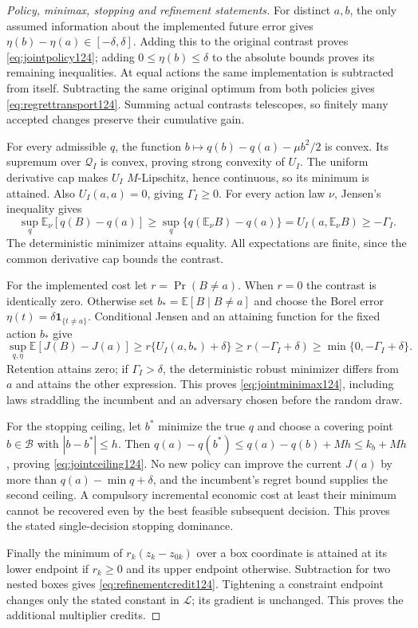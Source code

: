 \begin{proof}[Policy, minimax, stopping and refinement statements]
For distinct $a,b$, the only assumed information about the implemented
future error gives $\eta(b)-\eta(a)\in[-\delta,\delta]$.
Adding this to the original contrast proves
\eqref{eq:jointpolicy124}; adding $0\le\eta(b)\le\delta$ to
the absolute bounds proves its remaining inequalities. At equal
actions the same implementation is subtracted from itself. Subtracting
the same original optimum from both policies gives
\eqref{eq:regrettransport124}. Summing actual contrasts telescopes,
so finitely many accepted changes preserve their cumulative gain.

For every admissible $q$, the function
$b\mapsto q(b)-q(a)-\mu b^2/2$ is convex. Its supremum over
$\mathcal Q_I$ is convex, proving strong convexity of $U_I$.
The uniform derivative cap makes $U_I$ $M$-Lipschitz, hence continuous,
so its minimum is attained. Also $U_I(a,a)=0$, giving $\Gamma_I\ge0$.
For every action law $\nu$, Jensen's inequality gives
\[
 \sup_q\mathbb E_\nu[q(B)-q(a)]
       \ge\sup_q\{q(\mathbb E_\nu B)-q(a)\}
       =U_I(a,\mathbb E_\nu B)\ge-\Gamma_I.
\]
The deterministic minimizer attains equality. All expectations are
finite, since the common derivative cap bounds the contrast.

For the implemented cost let $r=\Pr(B\ne a)$. When $r=0$ the
contrast is identically zero. Otherwise set
$b_*=\mathbb E[B\mid B\ne a]$ and choose the Borel error
$\eta(t)=\delta\boldsymbol1_{\{t\ne a\}}$. Conditional Jensen
and an attaining function for the fixed action $b_*$ give
\[
 \sup_{q,\eta}\mathbb E[J(B)-J(a)]
 \ge r\{U_I(a,b_*)+\delta\}
 \ge r(-\Gamma_I+\delta)
 \ge\min\{0,-\Gamma_I+\delta\}.
\]
Retention attains zero; if $\Gamma_I>\delta$, the deterministic
robust minimizer differs from $a$ and attains the other expression.
This proves \eqref{eq:jointminimax124}, including laws straddling
the incumbent and an adversary chosen before the random draw.

For the stopping ceiling, let $b^*$ minimize the true $q$ and
choose a covering point $b\in\mathcal B$ with $|b-b^*|\le h$.
Then
$q(a)-q(b^*)\le q(a)-q(b)+Mh\le k_b+Mh$, proving
\eqref{eq:jointceiling124}. No new policy can improve the current
$J(a)$ by more than $q(a)-\min q+\delta$, and the incumbent's
regret bound supplies the second ceiling. A compulsory incremental
economic cost at least their minimum cannot be recovered even by
the best feasible subsequent decision. This proves the stated
single-decision stopping dominance.

Finally the minimum of $r_k(z_k-z_{0k})$ over a box coordinate is
attained at its lower endpoint if $r_k\ge0$ and its upper endpoint
otherwise. Subtraction for two nested boxes gives
\eqref{eq:refinementcredit124}. Tightening a constraint endpoint
changes only the stated constant in $\mathcal L$; its gradient is
unchanged. This proves the additional multiplier credits.
\end{proof}

